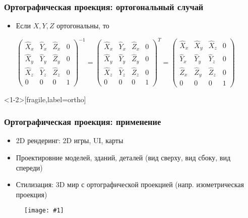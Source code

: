 \documentclass[10pt]{beamer}
\newcommand{\slideimage}[1]{
  \begin{figure}
    \begin{adjustbox}{width=\textwidth, totalheight=\textheight-2\baselineskip-2\baselineskip,keepaspectratio}
      \texttt{[image: \#1]}
    \end{adjustbox}
  \end{figure}
}
\begin{document}
\begin{frame}[fragile]
\frametitle{Ортографическая проекция: ортогональный случай}
\begin{itemize}
\item Если \begin{math}X, Y, Z\end{math} ортогональны, то 
\begin{center}
\begin{math}
\begin{pmatrix}
\hat X_x & \hat Y_x & \hat Z_x & 0 \\
\hat X_y & \hat Y_y & \hat Z_y & 0 \\
\hat X_z & \hat Y_z & \hat Z_z & 0 \\
0 & 0 & 0 & 1
\end{pmatrix}^{-1}
=
\begin{pmatrix}
\hat X_x & \hat Y_x & \hat Z_x & 0 \\
\hat X_y & \hat Y_y & \hat Z_y & 0 \\
\hat X_z & \hat Y_z & \hat Z_z & 0 \\
0 & 0 & 0 & 1
\end{pmatrix}^T
=
\begin{pmatrix}
\hat X_x & \hat X_y & \hat X_z & 0 \\
\hat Y_x & \hat Y_y & \hat Y_z & 0 \\
\hat Z_x & \hat Z_y & \hat Z_z & 0 \\
0 & 0 & 0 & 1
\end{pmatrix}
\end{math}
\end{center}
\end{itemize}
\end{frame}

\begin{frame}<1-2>[fragile,label=ortho]
\frametitle{Ортографическая проекция: применение}
\begin{itemize}
\pause
\item 2D рендеринг: 2D игры, UI, карты
\pause
\item Проектировние моделей, зданий, деталей (вид сверху, вид сбоку, вид спереди)
\pause
\item Стилизация: 3D мир с ортографической проекцией (напр. изометрическая проекция)
\end{itemize}
\end{frame}

\begin{frame}
\slideimage{mario.jpg}
\end{frame}
\end{document}
